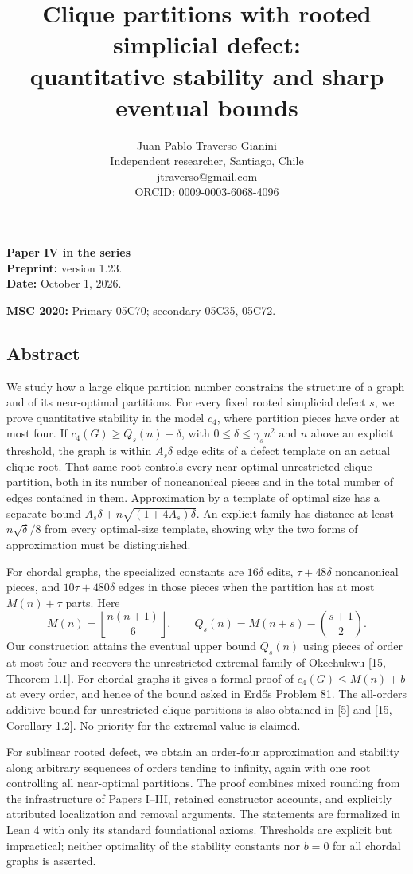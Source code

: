 \documentclass[english,11pt,a4paper]{article}
\title{Clique partitions with rooted simplicial defect:\\quantitative stability and sharp eventual bounds}
\author{Juan Pablo Traverso Gianini\\
\small Independent researcher, Santiago, Chile\\
\small \href{mailto:jtraverso@gmail.com}{jtraverso@gmail.com}\\
\small ORCID: 0009-0003-6068-4096}
\date{}
\begin{document}
\raggedbottom
\maketitle
\textbf{Paper IV in the series}\\
\textbf{Preprint:} version 1.23.\\
\textbf{Date:} October 1, 2026.

\textbf{MSC 2020:} Primary 05C70; secondary 05C35, 05C72.

\subsection{Abstract}\label{abstract}

We study how a large clique partition number constrains the structure of a graph and of its near-optimal partitions. For every fixed rooted simplicial defect \(s\), we prove quantitative stability in the model \(c_4\), where partition pieces have order at most four. If \(c_4(G)\ge Q_s(n)-\delta\), with \(0\le\delta\le\gamma_s n^2\) and \(n\) above an explicit threshold, the graph is within \(A_s\delta\) edge edits of a defect template on an actual clique root. That same root controls every near-optimal unrestricted clique partition, both in its number of noncanonical pieces and in the total number of edges contained in them. Approximation by a template of optimal size has a separate bound \(A_s\delta+n\sqrt{(1+4A_s)\delta}\). An explicit family has distance at least \(n\sqrt{\delta}/8\) from every optimal-size template, showing why the two forms of approximation must be distinguished.

For chordal graphs, the specialized constants are \(16\delta\) edits, \(\tau+48\delta\) noncanonical pieces, and \(10\tau+480\delta\) edges in those pieces when the partition has at most \(M(n)+\tau\) parts. Here \[
M(n)=\left\lfloor\frac{n(n+1)}6\right\rfloor,\qquad
Q_s(n)=M(n+s)-\binom{s+1}{2}.
\] Our construction attains the eventual upper bound \(Q_s(n)\) using pieces of order at most four and recovers the unrestricted extremal family of Okechukwu {[}15, Theorem 1.1{]}. For chordal graphs it gives a formal proof of \(c_4(G)\le M(n)+b\) at every order, and hence of the bound asked in Erdős Problem 81. The all-orders additive bound for unrestricted clique partitions is also obtained in {[}5{]} and {[}15, Corollary 1.2{]}. No priority for the extremal value is claimed.

For sublinear rooted defect, we obtain an order-four approximation and stability along arbitrary sequences of orders tending to infinity, again with one root controlling all near-optimal partitions. The proof combines mixed rounding from the infrastructure of Papers I--III, retained constructor accounts, and explicitly attributed localization and removal arguments. The statements are formalized in Lean 4 with only its standard foundational axioms. Thresholds are explicit but impractical; neither optimality of the stability constants nor \(b=0\) for all chordal graphs is asserted.
\end{document}
